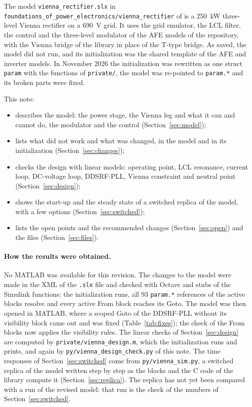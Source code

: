 \documentclass[11pt,a4paper]{scrartcl}
\newcommand{\code}[1]{\texttt{#1}}
\newcommand{\us}{\_\allowbreak}  %
\begin{document}
\begin{onehalfspace}
The model \code{vienna\_rectifier.slx} in \code{foundations\us of\us power\us electronics/\allowbreak vienna\us rectifier} of \cite{model_repo} is a \SI{250}{\kilo\watt} three-level Vienna rectifier \cite{kolar1997, kolar2013} on a \SI{690}{\volt} grid. It uses the grid emulator, the LCL filter, the control and the three-level modulator of the AFE models of the repository, with the Vienna bridge of the library \cite{library_repo} in place of the T-type bridge. As saved, the model did not run, and its initialization was the shared template of the AFE and inverter models. In November 2026 the initialization was rewritten as one struct \code{param} with the functions of \code{private/}, the model was re-pointed to \code{param.*} and its broken parts were fixed.

This note:
\begin{itemize}[nosep]
	\item describes the model: the power stage, the Vienna leg and what it can and cannot do, the modulator and the control (Section~\ref{sec:model});
	\item lists what did not work and what was changed, in the model and in its initialization (Section~\ref{sec:changes});
	\item checks the design with linear models: operating point, LCL resonance, current loop, DC-voltage loop, DDSRF-PLL, Vienna constraint and neutral point (Section~\ref{sec:design});
	\item shows the start-up and the steady state of a switched replica of the model, with a few options (Section~\ref{sec:switched});
	\item lists the open points and the recommended changes (Section~\ref{sec:open}) and the files (Section~\ref{sec:files}).
\end{itemize}

\paragraph{How the results were obtained.} No MATLAB was available for this revision. The changes to the model were made in the XML of the \code{.slx} file and checked with Octave and stubs of the Simulink functions: the initialization runs, all \num{93} \code{param.*} references of the active blocks resolve and every active From block reaches its Goto. The model was then opened in MATLAB, where a scoped Goto of the DDSRF-PLL without its visibility block came out and was fixed (Table~\ref{tab:fixes}); the check of the From blocks now applies the visibility rules. The linear checks of Section~\ref{sec:design} are computed by \code{private/vienna\_design.m}, which the initialization runs and prints, and again by \code{py/vienna\_design\_check.py} of this note. The time responses of Section~\ref{sec:switched} come from \code{py/vienna\_sim.py}, a switched replica of the model written step by step as the blocks and the C code of the library compute it (Section~\ref{sec:replica}). The replica has not yet been compared with a run of the revised model: that run is the check of the numbers of Section~\ref{sec:switched}.


\end{onehalfspace}
\end{document}
